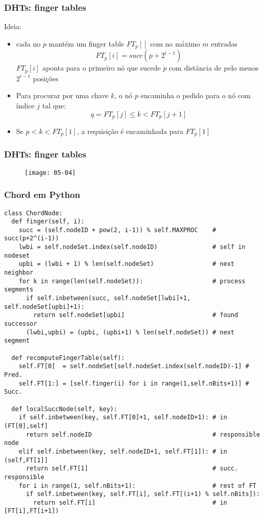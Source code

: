 \documentclass[Ligatures=TeX,table,brazil,svgnames,usetotalslideindicator,compress,10pt]{beamer}
\begin{document}
\begin{frame}
  \frametitle{DHTs: finger tables}

  Ideia:
  \begin{itemize}
  \item cada no $p$ mantém um \alert{finger table} $FT_p[]$ com no máximo $m$ entradas
    \[ FT_p[i] = succ(p+2^{i-1}) \]
    $FT_p[i]$ aponta para o primeiro nó que sucede $p$ com distância de pelo menos $2^{i-1}$ posições
  \item Para procurar por uma chave $k$, o nó $p$ encaminha o pedido para o nó com índice $j$ tal que:
    \[ q = FT_p[j] \leq k < FT_p[j+1]  \]
  \item Se $p < k < FT_p[1]$, a requisição é encaminhada para $FT_p[1]$
  \end{itemize}

\end{frame}

\begin{frame}
  \frametitle{DHTs: finger tables}
  \begin{figure}
    \centering
    \texttt{[image: 05-04]}
  \end{figure}
\end{frame}

\begin{frame}[fragile]
  \frametitle{Chord em Python}
\scriptsize
\begin{verbatim}
class ChordNode:
  def finger(self, i):
    succ = (self.nodeID + pow(2, i-1)) % self.MAXPROC    # succ(p+2^(i-1))
    lwbi = self.nodeSet.index(self.nodeID)               # self in nodeset
    upbi = (lwbi + 1) % len(self.nodeSet)                # next neighbor
    for k in range(len(self.nodeSet)):                   # process segments
      if self.inbetween(succ, self.nodeSet[lwbi]+1, self.nodeSet[upbi]+1):
        return self.nodeSet[upbi]                        # found successor
      (lwbi,upbi) = (upbi, (upbi+1) % len(self.nodeSet)) # next segment

  def recomputeFingerTable(self):
    self.FT[0]  = self.nodeSet[self.nodeSet.index(self.nodeID)-1] # Pred.
    self.FT[1:] = [self.finger(i) for i in range(1,self.nBits+1)] # Succ.

  def localSuccNode(self, key):
    if self.inbetween(key, self.FT[0]+1, self.nodeID+1): # in (FT[0],self]
      return self.nodeID                                 # responsible node
    elif self.inbetween(key, self.nodeID+1, self.FT[1]): # in (self,FT[1]]
      return self.FT[1]                                  # succ. responsible
    for i in range(1, self.nBits+1):                     # rest of FT
      if self.inbetween(key, self.FT[i], self.FT[(i+1) % self.nBits]):
        return self.FT[i]                                # in [FT[i],FT[i+1])
\end{verbatim}
\end{frame}
\end{document}
